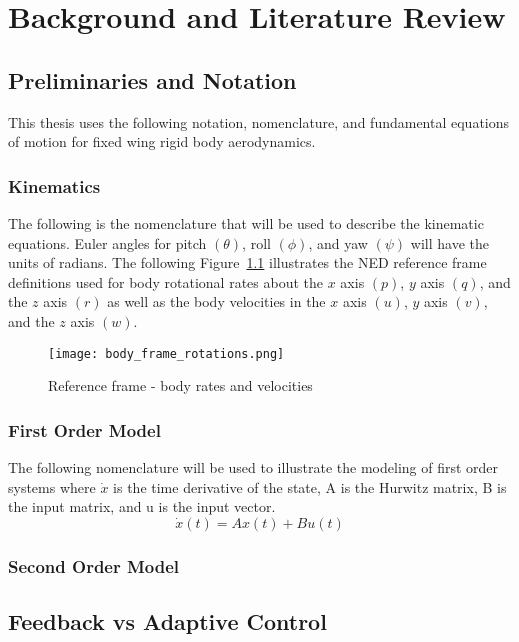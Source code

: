 \chapter{Background and Literature Review}\label{ch:problem}
\section{Preliminaries and Notation}\label{preliminaries}
This thesis uses the following notation, nomenclature, and fundamental equations of motion for fixed wing rigid body aerodynamics.

\subsection{Kinematics}
The following is the nomenclature that will be used to describe the kinematic equations.  Euler angles for pitch $(\theta)$, roll $(\phi)$, and yaw $(\psi)$ will have the units of radians.  The following Figure~\ref{fig:reference_frame} illustrates the \ac{NED} reference frame definitions used for body rotational rates about the $x$ axis $(p)$, $y$ axis $(q)$, and the $z$ axis $(r)$ as well as the body velocities in the $x$ axis $(u)$, $y$ axis $(v)$, and the $z$ axis $(w)$.

\begin{figure}[h!]
 \centering
  \texttt{[image: body\_frame\_rotations.png]}
  \caption{Reference frame - body rates and velocities}
  \label{fig:reference_frame}
\end{figure}

\subsection{First Order Model}
The following nomenclature will be used to illustrate the modeling of first order systems where $\dot{x}$ is the time derivative of the state, A is the Hurwitz matrix, B is the input matrix, and u is the input vector.
\begin{equation}
\dot{x}(t)=Ax(t)+Bu(t)
\end{equation}

\subsection{Second Order Model}


\section{Feedback vs Adaptive Control}

